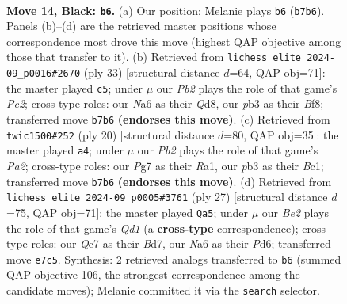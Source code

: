 \documentclass[11pt]{article}
\begin{document}
\begin{figure}[p]
\label{fig:thought-m25}
\end{figure}

\clearpage

\begin{figure}[p]\centering
\begin{subfigure}{0.46\textwidth}\centering
\resizebox{\linewidth}{!}{%
\newchessgame
\chessboard[
  setfen={r2rb1k1/ppq1bpp1/n1p1pn2/7p/P1NP1P2/1PN3P1/4P1BP/R1BQR1K1 b - - 1 14},
  showmover=false,
  pgfstyle=straightmove, color=movearrow, markmove={b7-b6}
]}
\caption{}
\end{subfigure}\hfill
\begin{subfigure}{0.46\textwidth}\centering
\resizebox{\linewidth}{!}{%
\newchessgame
\chessboard[
  setfen={r2qrbk1/1bp2p2/p2p1npp/1p6/2nNP3/2P2PN1/PPB3PP/R1BQR1K1 b - - 2 17},
  showmover=false,
  pgfstyle=straightmove, color=movearrow, markmove={c7-c5}
]}
\caption{}
\end{subfigure}
\\[4pt]
\begin{subfigure}{0.46\textwidth}\centering
\resizebox{\linewidth}{!}{%
\newchessgame
\chessboard[
  setfen={r1bqr1k1/ppp2pp1/2np1n1p/8/2P1p3/2P1N1P1/PP2PPBP/R1BQ1RK1 w - - 0 11},
  showmover=false,
  pgfstyle=straightmove, color=movearrow, markmove={a2-a4}
]}
\caption{}
\end{subfigure}\hfill
\begin{subfigure}{0.46\textwidth}\centering
\resizebox{\linewidth}{!}{%
\newchessgame
\chessboard[
  setfen={r2qrbk1/pp1b1ppp/2pp1nn1/8/P2NPP2/2N4P/1PP3P1/R1BQRBK1 b - - 4 14},
  showmover=false,
  pgfstyle=straightmove, color=movearrow, markmove={d8-a5}
]}
\caption{}
\end{subfigure}
\caption{\textbf{Move 14, Black: \texttt{b6}.} (a) Our position; Melanie plays \texttt{b6} (\texttt{b7b6}). Panels (b)--(d) are the retrieved master positions whose correspondence most drove this move (highest QAP objective among those that transfer to it). (b) Retrieved from \texttt{lichess\_elite\_2024-09\_p0016\#2670} (ply 33) [structural distance $d$=64, QAP obj=71]: the master played \texttt{c5}; under $\mu$ our \emph{Pb2} plays the role of that game's \emph{Pc2}; cross-type roles: our \emph{N}a6 as their \emph{Q}d8, our \emph{p}b3 as their \emph{B}f8; transferred move \texttt{b7b6} \textbf{(endorses this move)}. (c) Retrieved from \texttt{twic1500\#252} (ply 20) [structural distance $d$=80, QAP obj=35]: the master played \texttt{a4}; under $\mu$ our \emph{Pb2} plays the role of that game's \emph{Pa2}; cross-type roles: our \emph{P}g7 as their \emph{R}a1, our \emph{p}b3 as their \emph{B}c1; transferred move \texttt{b7b6} \textbf{(endorses this move)}. (d) Retrieved from \texttt{lichess\_elite\_2024-09\_p0005\#3761} (ply 27) [structural distance $d$=75, QAP obj=71]: the master played \texttt{Qa5}; under $\mu$ our \emph{Be2} plays the role of that game's \emph{Qd1} (a \textbf{cross-type} correspondence); cross-type roles: our \emph{Q}c7 as their \emph{B}d7, our \emph{N}a6 as their \emph{P}d6; transferred move \texttt{e7c5}. Synthesis: 2 retrieved analogs transferred to \texttt{b6} (summed QAP objective 106, the strongest correspondence among the candidate moves); Melanie committed it via the \texttt{search} selector.}

\end{figure}
\end{document}

